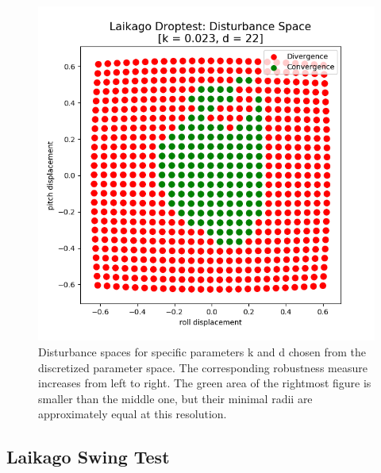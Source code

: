 \begin{figure}[h]
\begin{minipage}{0.33\textwidth}
        \end{minipage}
        \begin{minipage}{0.33\textwidth}
            \centering
            \includegraphics[width=\textwidth]{figures/droptest_ds_opt_correct.png} %
        \end{minipage}

    \caption[Disturbance Spaces for Selected Parameter Sets, Drop Test]{Disturbance spaces for specific parameters k and d chosen from the discretized parameter space. The corresponding robustness measure increases from left to right. The green area of the rightmost figure is smaller than the middle one, but their minimal radii are approximately equal at this resolution.}
    \label{fig:dropds}
    \end{figure}
    \newpage



    \subsection{Laikago Swing Test}

